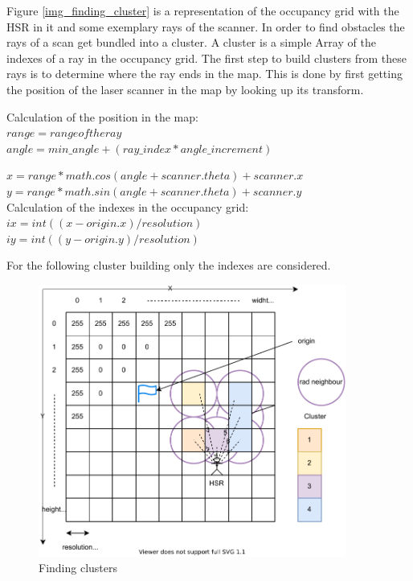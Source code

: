 \documentclass[main.tex]{subfiles}
\begin{document}
		Figure \ref{img_finding_cluster} is a representation of the occupancy grid with the HSR in it and some exemplary rays of the scanner. In order to find obstacles the rays of a scan get bundled into a cluster. A cluster is a simple Array of the indexes of a ray in the occupancy grid.
		The first step to build clusters from these rays is to determine where the ray ends in the map. This is done by first getting the position of the laser scanner in the map by looking up its transform.
		
		Calculation of the position in the map:\\		
		$range = range of the ray$\\
		$angle = min\_angle + (ray\_index * angle\_increment)$
		
		$x = range * math.cos(angle + scanner.theta) + scanner.x$\\
		$y = range * math.sin(angle + scanner.theta) + scanner.y$\\
		
		Calculation of the indexes in the occupancy grid:\\
		$ix = int((x - origin.x) / resolution)$\\
		$iy = int((y - origin.y) / resolution)$
		
		For the following cluster building only the indexes are considered.
		
		\begin{figure}[H]
			\centering
			\includegraphics[width=0.9\textwidth]{pictures/obstacle_finder/Cluster-building2.pdf}
			\caption{Finding clusters}
			\label{img_building_cluster}
		\end{figure}
		
\end{document}
